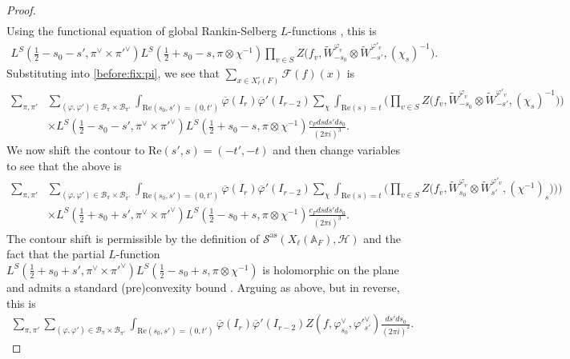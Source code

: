 \documentclass[12pt]{amsart}
\theoremstyle{remark}
\numberwithin{equation}{section}
\newcommand{\A}{\mathbb{A}}
\theoremstyle{definition}
\numberwithin{equation}{subsection}
\begin{document}
\begin{proof}
\begin{align*}
\end{align*}
Using the functional equation of global Rankin-Selberg $L$-functions \cite[Theorem 4.1]{CogdellPCMI},  this is 
\begin{align*}
L^S(\tfrac{1}{2}-s_0-s',\pi^\vee \times \pi'^\vee) 
        L^S(\tfrac{1}{2}+s_0-s,\pi\otimes \chi^{-1} )\prod_{v\in S}Z\big(f_v,\widetilde{W}^{\varphi_v}_{-s_0} \otimes \widetilde{W}^{\varphi'_v}_{-s'},(\chi_{s})^{-1}\big).
\end{align*}
Substituting into \eqref{before:fix:pi}, we see that $\sum_{x\in X_\ell^\circ(F)} \mathcal{F}(f)(x)$ is
\begin{align*}
\sum_{\pi,\pi'}&\sum_{(\varphi,\varphi') \in \mathcal{B}_{\pi} \times \mathcal{B}_{\pi'}}\int_{\mathrm{Re}(s_0,s')=(0,t')}\overline{\varphi}(I_r)\overline{\varphi}'(I_{r-2}) \sum_{\chi}\int_{\mathrm{Re}(s)=t}\Bigg(\prod_{v\in S}Z\big(f_v,\widetilde{W}^{\varphi_v}_{-s_0} \otimes \widetilde{W}^{\varphi'_v}_{-s'},(\chi_{s})^{-1}\big) \Bigg)\\
        & \times L^S(\tfrac{1}{2}-s_0-s',\pi^\vee \times \pi'^\vee) 
        L^S(\tfrac{1}{2}+s_0-s,\pi\otimes \chi^{-1} )\frac{c_F ds ds'ds_0}{(2\pi i)^3}.
\end{align*}
We now shift the contour to $\mathrm{Re}(s',s)=(-t',-t)$ and then change variables to see that the above is  
\begin{align*}
\sum_{\pi,\pi'}&\sum_{(\varphi,\varphi') \in \mathcal{B}_{\pi} \times \mathcal{B}_{\pi'}}\int_{\mathrm{Re}(s_0,s')=(0,t')}\overline{\varphi}(I_r)\overline{\varphi}'(I_{r-2}) \sum_{\chi}\int_{\mathrm{Re}(s)=t}\Bigg(\prod_{v\in S}Z\big(f_v,\widetilde{W}^{\varphi_v}_{s_0} \otimes \widetilde{W}^{\varphi'_v}_{s'},(\chi^{-1})_s)\big) \Bigg)\\
        & \times L^S(\tfrac{1}{2}+s_0+s',\pi^\vee \times \pi'^\vee) 
        L^S(\tfrac{1}{2}-s_0+s,\pi\otimes \chi^{-1} )\frac{c_F ds ds'ds_0}{(2\pi i)^3}.
\end{align*}
The contour shift is permissible by the definition of $\mathcal{S}^{\mathrm{as}}(X_\ell(\A_F),\mathcal{H})$ and the fact that the partial $L$-function $L^S(\tfrac{1}{2}+s_0+s',\pi^\vee \times \pi'^\vee) 
        L^S(\tfrac{1}{2}-s_0+s,\pi\otimes \chi^{-1} )$ is holomorphic on the plane and admits a standard (pre)convexity bound \cite[\S 1]{BrumleyNarrow}.
Arguing as above, but in reverse, this is 
\begin{align*}
\sum_{\pi,\pi'}\sum_{(\varphi,\varphi') \in \mathcal{B}_{\pi} \times \mathcal{B}_{\pi'}}\int_{\mathrm{Re}(s_0,s')=(0,t')}\overline{\varphi}(I_r)\overline{\varphi}'(I_{r-2}) Z(f,\varphi^\vee_{s_0},\varphi'^\vee_{s'})\frac{ds'ds_0}{(2\pi i)^2}.

\end{align*}
\end{proof}
\end{document}
